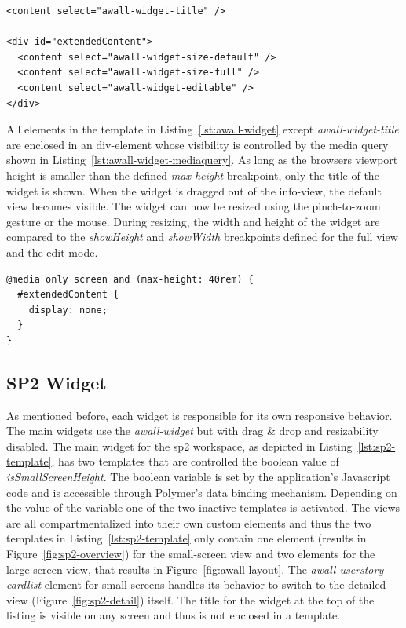 \documentclass{sigchi}
\begin{document}
\begin{lstlisting}
<content select="awall-widget-title" />

<div id="extendedContent">
  <content select="awall-widget-size-default" />
  <content select="awall-widget-size-full" />
  <content select="awall-widget-editable" />
</div>
\end{lstlisting}


All elements in the template in Listing~\ref{lst:awall-widget} except \textit{awall-widget-title} are enclosed in an div-element whose visibility is controlled by the media query shown in Listing~\ref{lst:awall-widget-mediaquery}.
As long as the browsers viewport height is smaller than the defined \textit{max-height} breakpoint, only the title of the widget is shown.
When the widget is dragged out of the info-view, the default view becomes visible.
The widget can now be resized using the pinch-to-zoom gesture or the mouse.
During resizing, the width and height of the widget are compared to the \textit{showHeight} and \textit{showWidth} breakpoints defined for the full view and the edit mode.


\begin{lstlisting}
@media only screen and (max-height: 40rem) {
  #extendedContent {
    display: none;
  }
}
\end{lstlisting}

\subsection{SP2 Widget}
As mentioned before, each widget is responsible for its own responsive behavior.
The main widgets use the \textit{awall-widget} but with drag \& drop and resizability disabled.
The main widget for the \gls{sp2} workspace, as depicted in Listing~\ref{lst:sp2-template}, has two templates that are controlled the boolean value of \textit{isSmallScreenHeight}.
The boolean variable is set by the application's Javascript code and is accessible through Polymer's data binding mechanism.
Depending on the value of the variable one of the two inactive templates is activated.
The views are all compartmentalized into their own custom elements and thus the two templates in Listing~\ref{lst:sp2-template} only contain one element (results in Figure~\ref{fig:sp2-overview}) for the small-screen view and two elements for the large-screen view, that results in Figure~\ref{fig:awall-layout}.
The \textit{awall-userstory-cardlist} element for small screens handles its behavior to switch to the detailed view (Figure~\ref{fig:sp2-detail}) itself.
The title for the widget at the top of the listing is visible on any screen and thus is not enclosed in a template.
\end{document}
